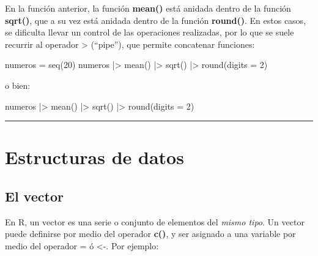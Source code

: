 \documentclass[
  spanish,
  letterpaper,
  DIV=11,
  numbers=noendperiod]{scrreprt}
\newenvironment{Shaded}{\begin{snugshade}}{\end{snugshade}}
\newcommand{\AttributeTok}[1]{\textcolor[rgb]{0.40,0.45,0.13}{#1}}
\newcommand{\DecValTok}[1]{\textcolor[rgb]{0.68,0.00,0.00}{#1}}
\newcommand{\FunctionTok}[1]{\textcolor[rgb]{0.28,0.35,0.67}{#1}}
\newcommand{\NormalTok}[1]{\textcolor[rgb]{0.00,0.23,0.31}{#1}}
\newcommand{\OtherTok}[1]{\textcolor[rgb]{0.00,0.23,0.31}{#1}}
\newcommand{\SpecialCharTok}[1]{\textcolor[rgb]{0.37,0.37,0.37}{#1}}
\begin{document}
En la función anterior, la función \textbf{mean()} está anidada dentro
de la función \textbf{sqrt()}, que a su vez está anidada dentro de la
función \textbf{round()}. En estos casos, se dificulta llevar un control
de las operaciones realizadas, por lo que se suele recurrir al operador
\textbar\textgreater{} (``pipe''), que permite concatenar funciones:

\begin{Shaded}
\begin{Highlighting}[]

\NormalTok{numeros }\OtherTok{=} \FunctionTok{seq}\NormalTok{(}\DecValTok{20}\NormalTok{)}
\NormalTok{numeros }\SpecialCharTok{|\textgreater{}} \FunctionTok{mean}\NormalTok{() }\SpecialCharTok{|\textgreater{}} \FunctionTok{sqrt}\NormalTok{() }\SpecialCharTok{|\textgreater{}} \FunctionTok{round}\NormalTok{(}\AttributeTok{digits =} \DecValTok{2}\NormalTok{)}
\end{Highlighting}
\end{Shaded}

o bien:

\begin{Shaded}
\begin{Highlighting}[]

\NormalTok{numeros }\SpecialCharTok{|\textgreater{}} 
  \FunctionTok{mean}\NormalTok{() }\SpecialCharTok{|\textgreater{}} 
  \FunctionTok{sqrt}\NormalTok{() }\SpecialCharTok{|\textgreater{}} 
  \FunctionTok{round}\NormalTok{(}\AttributeTok{digits =} \DecValTok{2}\NormalTok{)}
\end{Highlighting}
\end{Shaded}

\begin{center}\rule{0.5\linewidth}{0.5pt}\end{center}

\section{Estructuras de datos}\label{estructuras-de-datos}

\subsection{El vector}\label{el-vector}

En R, un vector es una serie o conjunto de elementos del \emph{mismo
tipo}. Un vector puede definirse por medio del operador \textbf{c()}, y
ser asignado a una variable por medio del operador = ó \textless-. Por
ejemplo:
\end{document}
